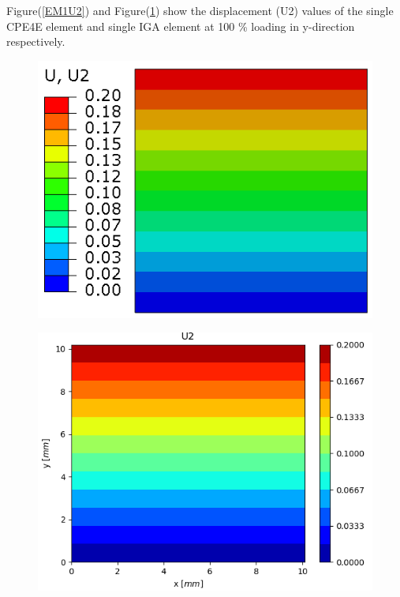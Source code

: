\documentclass[11pt]{article}
\begin{document}
\noindent
Figure(\ref{EM1U2}) and Figure(\ref{EM1U2_IGA}) show the displacement (U2) values of the single CPE4E element and single IGA element at 100 \% loading in y-direction respectively. \\
\begin{figure}[H]
	\centering
	\begin{minipage}{.5\textwidth}
		\centering
		\includegraphics[width=1\linewidth]{EM1U2.png}
		\label{EM1U2}
	\end{minipage}%
	\begin{minipage}{.5\textwidth}
		\centering
		\includegraphics[width=1\linewidth]{EM1U2_IGA.png}
		\label{EM1U2_IGA}
	\end{minipage}
\end{figure}
\end{document}
